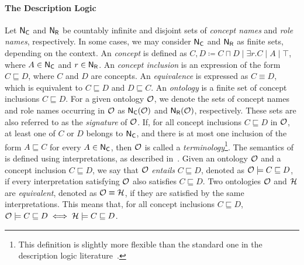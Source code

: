 \paragraph{The \EL Description Logic}
Let \({\sf N_C}\) and \({\sf N_R}\) be countably infinite and disjoint sets of \emph{concept names} and \emph{role names}, respectively.
%
In some cases, we may consider \({\sf N_C}\) and \({\sf N_R}\) as finite sets, depending on the context.
%
An \EL \emph{concept} is defined as \(C, D \coloneqq C \sqcap D \mid \exists r.C \mid A \mid \top\), where \(A \in {\sf N_C}\) and \(r \in {\sf N_R}\).
%
An \EL \emph{concept inclusion} is an expression of the form \(C \sqsubseteq D\), where \(C\) and \(D\) are \EL concepts.
%
An \EL \emph{equivalence} is expressed as \(C \equiv D\), which is equivalent to \(C \sqsubseteq D\) and \(D \sqsubseteq C\).
%
An \EL \emph{ontology} is a finite set of \EL concept inclusions \(C \sqsubseteq D\).
%
For a given ontology \(\mathcal{O}\), we denote the sets of concept names and role names occurring in \(\mathcal{O}\) as \({\sf N_C}(\mathcal{O})\) and \({\sf N_R}(\mathcal{O})\), respectively.
%
These sets are also referred to as the \emph{signature} of \(\mathcal{O}\).
%
If, for all concept inclusions \(C \sqsubseteq D\) in \(\mathcal{O}\), at least one of \(C\) or \(D\) belongs to \({\sf N_C}\), and there is at most one inclusion of the form \(A \sqsubseteq C\) for every \(A \in {\sf N_C}\), then \(\mathcal{O}\) is called a \emph{terminology}\footnote{This definition is slightly more flexible than the standard one in the description logic literature~\cite{DBLP:books/daglib/0041477}.}.
%
The semantics of \EL is defined using interpretations, as described in~\cite{DBLP:books/daglib/0041477}.
%
Given an ontology \(\mathcal{O}\) and a concept inclusion \(C \sqsubseteq D\), we say that \(\mathcal{O}\) \emph{entails} \(C \sqsubseteq D\), denoted as \(\mathcal{O} \models C \sqsubseteq D\), if every interpretation satisfying \(\mathcal{O}\) also satisfies \(C \sqsubseteq D\).
%
Two ontologies \(\mathcal{O}\) and \(\mathcal{H}\) are \emph{equivalent}, denoted as \(\mathcal{O} \equiv \mathcal{H}\), if they are satisfied by the same interpretations.
%
This means that, for all concept inclusions \(C \sqsubseteq D\), \(\mathcal{O} \models C \sqsubseteq D \iff \mathcal{H} \models C \sqsubseteq D\).


